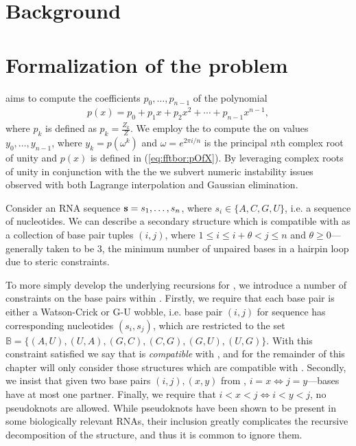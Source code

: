 \section{Background}
\label{sec:fftbor:bkgrnd}

\section{Formalization of the problem}
\label{sec:fftbor:formal}

\fftbor aims to compute the coefficients $p_0,\ldots,p_{n-1}$ of the polynomial
\begin{eqnarray}
\label{eq:fftbor:pOfX}
p(x) = p_0 + p_1 x + p_2 x^2 + \cdots + p_{n-1} x^{n-1},
\end{eqnarray}
where $p_k$ is defined as $p_k = \frac{Z_k}{Z}$. We employ the \fft to compute
the \idft on values $y_0,\ldots,y_{n-1}$, where
$y_k = p(\omega^k)$ and $\omega = e^{2 \pi i/n}$ is the principal $n$th complex
root of unity and $p(x)$ is defined in (\ref{eq:fftbor:pOfX}). By leveraging
complex
roots of unity in conjunction with the \idft the we subvert numeric instability
issues observed with both Lagrange interpolation and Gaussian elimination.

Consider an RNA sequence ${\bf s} = s_1,\ldots,s_n$, where
$s_i \in \{A,C,G,U\}$, i.e. a sequence of nucleotides. We can describe a
secondary structure \strS which is compatible with \seq as a collection of
base pair tuples $(i,j)$, where $1 \le i \le i+\theta < j \le n$ and
$\theta \ge 0$---generally taken to be 3, the minimum number of unpaired bases
in a hairpin loop due to steric constraints.

To more simply develop the underlying recursions for \fftbor, we introduce a
number of constraints on the base pairs within \strS. Firstly, we require that
each base pair is either a Watson-Crick or G-U wobble, i.e. base pair $(i,j)$
for sequence \seq has corresponding nucleotides $(s_i,s_j)$, which are
restricted
to the set $\mathbb{B} = \{(A,U), (U,A), (G,C), (C,G), (G,U), (U,G)\}$. With
this constraint satisfied we say that \strS is {\em compatible} with \seq, and
for the remainder of this chapter will only consider those structures which are
compatible with \seq.
Secondly, we insist that given two base pairs $(i,j), (x,y)$ from \strS,
$i=x \iff j=y$---bases have at most one partner. Finally, we require that
$i<x<j \iff i<y<j$, no pseudoknots are allowed. While pseudoknots have been
shown to be present in some biologically relevant RNAs, their inclusion greatly
complicates the recursive decomposition of the structure, and thus it is common
to ignore them.


